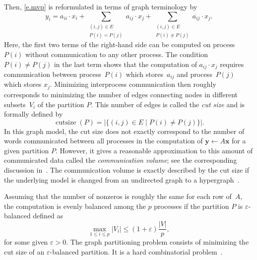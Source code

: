 \documentclass[12pt, oneside]{book}
\newcommand{\mat}[1]{\ensuremath{#1}}
\newcommand{\vek}[1]{{\ensuremath{\mathbf #1}}}
\begin{document}
Then, \eqref{e.mvp} is reformulated in terms of graph terminology by
\begin{displaymath}
y_i = a_{ii} \cdot x_i +
  \sum_{ \substack{(i,j)\in E \\ P(i)=P(j)}} a_{ij} \cdot x_j
+ \sum_{ \substack{(i,j)\in E \\ P(i)\neq P(j)}} a_{ij} \cdot x_j .
\end{displaymath}
Here, the first two terms of the right-hand side can be computed on process~$P(i)$
without communication to any other process.  The condition~$P(i)\neq P(j)$ in the last
term shows that the computation of $a_{ij} \cdot x_j$  requires communication between
process~$P(i)$ which stores~$a_{ij}$ and process~$P(j)$ which stores $x_j$. Minimizing
interprocess communication then roughly corresponds to minimizing the number of edges
connecting nodes in different subsets~$V_i$ of the partition $P$. This number of edges is
called the \emph{cut size} and is formally defined by
\begin{equation}\label{e.cut}
  \operatorname{cutsize}(P) = \bigl| \{ (i,j) \in E \mid P(i)\neq P(j) \} \bigr|.
\end{equation}
In this graph model, the cut size does not exactly correspond to the number of words
communicated between all processes in the computation of $\vek{y} \leftarrow \mat{A}
\vek{x}$ for a given partition $P$. However, it gives a reasonable approximation to this
amount of communicated data called the \emph{communication volume}; see the corresponding
discussion in~\cite{hk:mod}. The communication volume is exactly described by the cut
size if the underlying model is changed from an undirected graph to a
hypergraph~\cite{ca:hyp,cua:hyp,ua:rev}.

Assuming that the number of nonzeros is roughly the same for each row of~\mat{A}, the
computation is evenly balanced among the $p$ processes if the partition $P$ is
$\varepsilon$-balanced defined as
\begin{equation}\label{e.bal}
  \max_{1 \leq i \leq p} |V_i| \leq (1 + \varepsilon) \frac{|V|}{p} ,
\end{equation}
for some given $\varepsilon > 0$. The graph partitioning problem consists of minimizing
the cut size of an $\varepsilon$-balanced partition. It is a hard combinatorial
problem~\cite{gj:com}.
\end{document}
